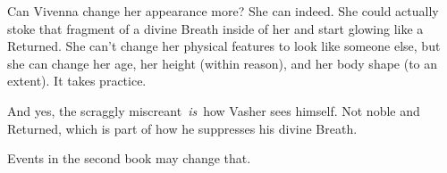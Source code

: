 \documentclass{article}
\begin{document}
Can Vivenna change her appearance more? She can indeed. She could actually stoke that fragment of a divine Breath inside of her and start glowing like a Returned. She can’t change her physical features to look like someone else, but she can change her age, her height (within reason), and her body shape (to an extent). It takes practice.

And yes, the scraggly miscreant~\textit{is}~how Vasher sees himself. Not noble and Returned, which is part of how he suppresses his divine Breath.

Events in the second book may change that.
\end{document}
